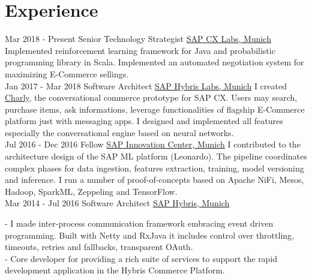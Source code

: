 \documentclass[letterpaper]{twentysecondcv} %
\begin{document}
\makeprofile %
 

\section{Experience}

\begin{twenty} %
\twentyitem
    	{Mar 2018 -}
		{Present}
        {Senior Technology Strategist}
        {\href{http://cx.sap.com/}{SAP CX Labs, Munich}}
        {}
        {
    		Implemented reinforcement learning framework for Java and probabilistic programming library in Scala. Implemented an automated negotiation system for maximizing E-Commerce sellings. 
	    }
        \\
\twentyitem
    	{Jan 2017 -}
		{Mar 2018}
        {Software Architect}
        {\href{http://cx.sap.com/}{SAP Hybris Labs, Munich}}
        {}
        {
        I created \href{http://charly.hybris.com/}{Charly}, the conversational commerce prototype for SAP CX. Users may search, purchase items, ask informations, leverage functionalities of flagship E-Commerce platform just with messaging apps.
      I designed and implemented all features especially the conversational engine based on neural networks.
      }
        \\
	\twentyitem
    	{Jul 2016 -}
		{Dec 2016 }
        {Fellow}
        {\href{https://icn.sap.com/}{SAP Innovation Center, Munich}}
        {}
        {
        {
        I contributed to the architecture design of the SAP ML platform (Leonardo). The pipeline coordinates complex phases for data ingestion, features extraction, training,
      model versioning and inference. I run a number of proof-of-concepts based on Apache NiFi, Mesos, Hadoop, SparkML, Zeppeling and TensorFlow.  
        }
        }
    \\   
    \twentyitem
   		{Mar 2014 -}
		{Jul 2016}
        {Software Architect}
        {\href{http://www.hybris.com}{SAP Hybris, Munich}}
        {}
        {
        {
        - I made inter-process communication framework embracing event driven programming. Built with Netty and RxJava it includes control over throttling, timeouts, retries and fallbacks, transparent OAuth.
        \\
        -  Core developer for providing a rich suite of services to support the rapid development application in the Hybris Commerce Platform. 

}}
\end{twenty}
\end{document}

